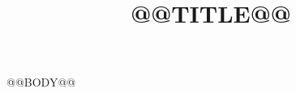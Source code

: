 \documentclass[11pt,a4paper]{article}
\title{@@TITLE@@}
\author{}
\date{}
\begin{document}
\maketitle
@@BODY@@


\end{document}
